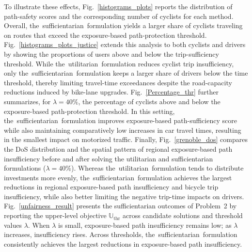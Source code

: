 \documentclass[lettersize,journal]{IEEEtran}
\begin{document}
To illustrate these effects, Fig.~\ref{histograms_plots} reports the distribution of path-safety scores and the corresponding number of cyclists for each method. Overall, \mbox{the sufficientarian formulation} yields a larger share of cyclists traveling on routes that exceed the exposure-based path-protection threshold. Fig.~\ref{histograms_plots_justice} extends this analysis to both cyclists and drivers by showing the proportions of users above and below the trip-sufficiency threshold. While \mbox{the utilitarian formulation} reduces cyclist trip insufficiency, only \mbox{the sufficientarian formulation} keeps a larger share of drivers below the time threshold, thereby limiting travel-time exceedances despite the road-capacity reductions induced by bike-lane upgrades. Fig.~\ref{Percentage_thr} further summarizes, for $\lambda = \mathrm{40\%}$, the percentage of cyclists above and below the exposure-based path-protection threshold. In this setting, \mbox{the sufficientarian formulation} improves exposure-based path-sufficiency score while also maintaining comparatively low increases in car travel times, resulting in the smallest impact on motorized traffic. Finally, Fig.~\ref{grenoble_dos} compares the DoS distribution and the spatial pattern of regional exposure-based path insufficiency before and after solving the utilitarian and sufficientarian formulations ($\lambda = 40\%$). Whereas \mbox{the utilitarian formulation} tends to distribute investments more evenly, \mbox{the sufficientarian formulation} achieves the largest reductions in regional exposure-based path insufficiency and bicycle trip insufficiency, while also better limiting the negative trip-time impacts on drivers. Fig.~\ref{unfairness_result} presents the sufficientarian outcomes of Problem~2 by reporting the upper-level objective $\mathbb{U}_{\text{thr}}$ across candidate solutions and threshold values $\lambda$. When $\lambda$ is small, exposure-based path insufficiency remains low; as $\lambda$ increases, insufficiency rises. Across thresholds, \mbox{the sufficientarian formulation} consistently achieves the largest reductions in exposure-based path insufficiency.

\end{document}

